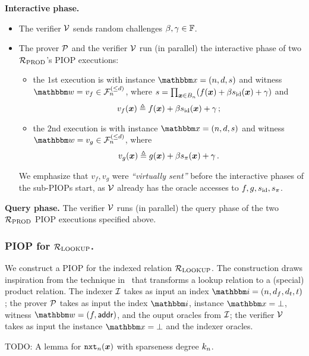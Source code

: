 \textbf{Interactive phase.} 
\begin{itemize}
    \item The verifier $\mathcal{V}$ sends random challenges $\beta, \gamma \in \mathbb{F}$.
    \item The prover $\mathcal{P}$ and the verifier $\mathcal{V}$ run (in parallel) the interactive phase 
    of two ${\mathcal{R}}_{\text{PROD}}$'s PIOP executions:
        \begin{itemize}
            \item the $1$st execution is with instance $\instR = (n, d, s)$ and
                witness $\witR = v_{f} \in \bdp{n}{d}$, where 
                $
                    s = \prod_{\boldsymbol{x}\in B_{n}} (f(\boldsymbol{x}) + \beta s_{\text{id}}(\boldsymbol{x}) + \gamma)
                $ and
                \[
                    v_{f}(\boldsymbol{x}) \mathrel{\triangleq} f(\boldsymbol{x}) + \beta s_{\text{id}}(\boldsymbol{x}) + \gamma \,;
                \]
            \item the $2$nd execution is with instance $\instR = (n, d, s)$ and 
                witness $\witR = v_{g} \in \bdp{n}{d}$, where 
                \[
                    v_{g}(\boldsymbol{x}) \mathrel{\triangleq} g(\boldsymbol{x}) + \beta s_{\pi}(\boldsymbol{x}) + \gamma \,.
                \]
        \end{itemize}
        We emphasize that $v_{f}, v_{g}$ were \emph{``virtually sent''} before the interactive phases of the sub-PIOPs start,
        as $\mathcal{V}$ already has the oracle accesses to $f, g, s_{\text{id}}, s_{\pi}$.
\end{itemize}

\textbf{Query phase.}
The verifier $\mathcal{V}$ runs (in parallel) the query phase of the two ${\mathcal{R}}_{\text{PROD}}$ PIOP 
executions specified above.

\subsubsection*{PIOP for ${\mathcal{R}}_{\text{LOOKUP}}$.} 
We construct a PIOP for the indexed relation ${\mathcal{R}}_{\text{LOOKUP}}$.
The construction draws inspiration from the technique in~\cite{GW20} that 
transforms a lookup relation to a (special) product relation.
The indexer $\mathcal{I}$ takes as input an index $\idxR = (n, d_f, d_t, t)$;
the prover $\mathcal{P}$ takes as input the index $\idxR$, instance $\instR = \bot$,
witness $\witR = (f, \addr)$, and the ouput oracles from $\mathcal{I}$;
the verifier $\mathcal{V}$ takes as input the instance $\instR = \bot$ and 
the indexer oracles.

\begin{lemma}
    TODO: A lemma for $\mathtt{nxt}_{n}(\boldsymbol{x})$ with sparseness degree $k_{n}$.
\end{lemma}

